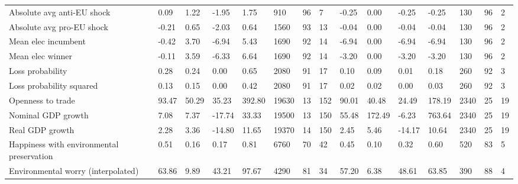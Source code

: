 \begin{longtable}{lllllllllllllll}
Absolute avg anti-EU shock & 0.09 & 1.22 & -1.95 & 1.75 & 910 & 96 & 7 & -0.25 & 0.00 & -0.25 & -0.25 & 130 & 96 & 2\\
\addlinespace
Absolute avg pro-EU shock & -0.21 & 0.65 & -2.03 & 0.64 & 1560 & 93 & 13 & -0.04 & 0.00 & -0.04 & -0.04 & 130 & 96 & 2\\
Mean elec incumbent & -0.42 & 3.70 & -6.94 & 5.43 & 1690 & 92 & 14 & -6.94 & 0.00 & -6.94 & -6.94 & 130 & 96 & 2\\
Mean elec winner & -0.11 & 3.59 & -6.33 & 6.64 & 1690 & 92 & 14 & -3.20 & 0.00 & -3.20 & -3.20 & 130 & 96 & 2\\
Loss probability & 0.28 & 0.24 & 0.00 & 0.65 & 2080 & 91 & 17 & 0.10 & 0.09 & 0.01 & 0.18 & 260 & 92 & 3\\
Loss probability squared & 0.13 & 0.15 & 0.00 & 0.42 & 2080 & 91 & 17 & 0.02 & 0.02 & 0.00 & 0.03 & 260 & 92 & 3\\
\addlinespace
Openness to trade & 93.47 & 50.29 & 35.23 & 392.80 & 19630 & 13 & 152 & 90.01 & 40.48 & 24.49 & 178.19 & 2340 & 25 & 19\\
Nominal GDP growth & 7.08 & 7.37 & -17.74 & 33.33 & 19500 & 13 & 150 & 55.48 & 172.49 & -6.23 & 763.64 & 2340 & 25 & 19\\
Real GDP growth & 2.28 & 3.36 & -14.80 & 11.65 & 19370 & 14 & 150 & 2.45 & 5.46 & -14.17 & 10.64 & 2340 & 25 & 19\\
Happiness with environmental preservation & 0.51 & 0.16 & 0.17 & 0.81 & 6760 & 70 & 42 & 0.45 & 0.10 & 0.32 & 0.60 & 520 & 83 & 5\\
Environmental worry (interpolated) & 63.86 & 9.89 & 43.21 & 97.67 & 4290 & 81 & 34 & 57.20 & 6.38 & 48.61 & 63.85 & 390 & 88 & 4\\
\bottomrule
\end{longtable}
